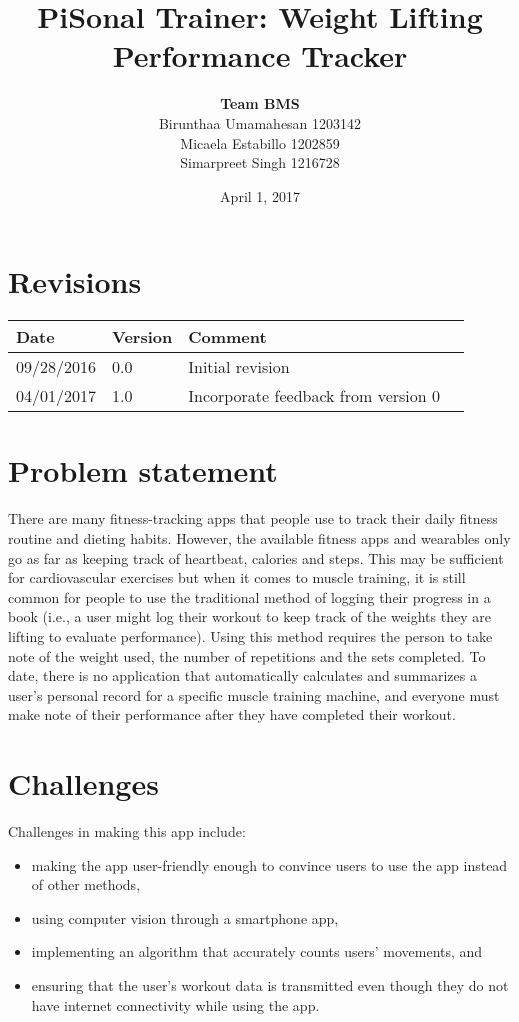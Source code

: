 \documentclass{article}
\title{PiSonal Trainer: Weight Lifting Performance Tracker}
\author{\textbf{Team BMS} \\ Birunthaa Umamahesan 1203142 \\ Micaela Estabillo 1202859 \\ Simarpreet Singh 1216728}
\date{April 1, 2017}
\begin{document}
\thispagestyle{plain}
\maketitle

\newpage
\tableofcontents

\section*{Revisions}
\begin{center}
    \begin{tabular}{ | l | l | l | c |} 
    \hline
    Date & Version & Comment \\ [0.5ex]
    \hline
    09/28/2016 & 0.0 & Initial revision  \\ 
    \hline
    04/01/2017 & 1.0 & Incorporate feedback from version 0 \\
    \hline
    \end{tabular}
\end{center}

\thispagestyle{plain}

\newpage

\clearpage
\setcounter{page}{1}
\section{Problem statement}

There are many fitness-tracking apps that people use to track their daily fitness routine and
dieting habits. However, the available fitness apps and wearables only go as far as keeping track 
of heartbeat, calories and steps. This may be sufficient for cardiovascular exercises but when it 
comes to muscle training, it is still common for people to use the traditional method of logging 
their progress in a book (i.e., a user might log their workout to keep track of the weights they 
are lifting to evaluate performance). Using this method requires the person to take note of the 
weight used, the number of repetitions and the sets completed. To date, there is no application 
that automatically calculates and summarizes a user’s personal record for a specific muscle 
training machine, and everyone must make note of their performance after they have completed their 
workout.

\section{Challenges}
Challenges in making this app include:
\begin{itemize}
    \item making the app user-friendly enough to convince users to use the app instead of other methods,
    \item using computer vision through a smartphone app,
    \item implementing an algorithm that accurately counts users' movements, and
    \item ensuring that the user's workout data is transmitted even though they do not have internet connectivity while using the app.
\end{itemize}
\end{document}
